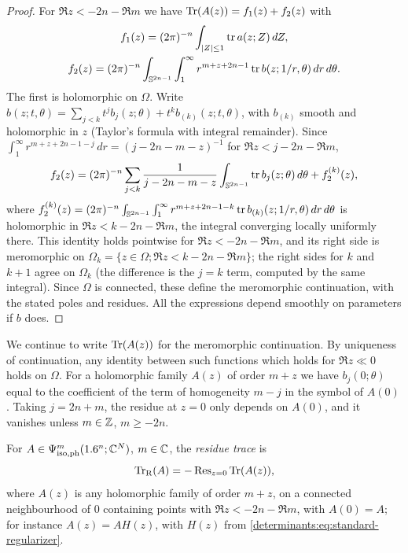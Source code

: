 \begin{proof}
  For $\Re z<-2n-\Re m$ we have $\operatorname{Tr}(A(z))=f_1(z)+f_2(z)$ with
  \begin{gather*}
    f_1(z)=(2\pi)^{-n}\int_{\lvert Z\rvert\le1}\operatorname{tr} a(z;Z)\,dZ,\\
    f_2(z)=(2\pi)^{-n}\int_{\mathbb{S}^{2n-1}}\int_1^\infty r^{m+z+2n-1}\operatorname{tr} b(z;1/r,\theta)\,dr\,d\theta .
  \end{gather*}
  The first is holomorphic on $\Omega$. Write
  $b(z;t,\theta)=\sum_{j<k}t^jb_j(z;\theta)+t^kb_{(k)}(z;t,\theta)$, with
  $b_{(k)}$ smooth and holomorphic in $z$ (Taylor's formula with integral
  remainder). Since $\int_1^\infty r^{m+z+2n-1-j}\,dr=(j-2n-m-z)^{-1}$ for
  $\Re z<j-2n-\Re m$,
  \begin{equation*}
    f_2(z)=(2\pi)^{-n}\sum_{j<k}\frac{1}{j-2n-m-z}\int_{\mathbb{S}^{2n-1}}\operatorname{tr} b_j(z;\theta)\,d\theta+f_2^{(k)}(z),
  \end{equation*}
  where $f_2^{(k)}(z)=(2\pi)^{-n}\int_{\mathbb{S}^{2n-1}}\int_1^\infty r^{m+z+2n-1-k}\operatorname{tr} b_{(k)}(z;1/r,\theta)\,dr\,d\theta$
  is holomorphic in $\Re z<k-2n-\Re m$, the integral converging locally
  uniformly there. This identity holds pointwise for $\Re z<-2n-\Re m$, and its
  right side is meromorphic on $\Omega_k=\{z\in\Omega;\Re z<k-2n-\Re m\}$; the
  right sides for $k$ and $k+1$ agree on $\Omega_k$ (the difference is the
  $j=k$ term, computed by the same integral). Since $\Omega$ is connected, these
  define the meromorphic continuation, with the stated poles and residues. All
  the expressions depend smoothly on parameters if $b$ does.
\end{proof}

We continue to write $\operatorname{Tr}(A(z))$ for the meromorphic continuation. By
uniqueness of continuation, any identity between such functions which holds
for $\Re z\ll0$ holds on $\Omega$. For a holomorphic family $A(z)$ of order
$m+z$ we have $b_j(0;\theta)$ equal to the coefficient of the term of
homogeneity $m-j$ in the symbol of $A(0)$. Taking $j=2n+m$, the residue at
$z=0$ only depends on $A(0)$, and it vanishes unless $m\in\mathbb{Z}$, $m\ge-2n$.

\begin{definition}\label{determinants:def:residue-trace}
  For $A\in\Psi^{m}_{\mathrm{iso,ph}}(1.6^n;\mathbb{C}^N)$, $m\in\mathbb{C}$, the \emph{residue trace} is
  \begin{equation*}
    \operatorname{Tr}_{\mathrm{R}}(A)=-\operatorname{Res}_{z=0}\operatorname{Tr}(A(z)),
  \end{equation*}
  where $A(z)$ is any holomorphic family of order $m+z$, on a connected
  neighbourhood of $0$ containing points with $\Re z<-2n-\Re m$, with
  $A(0)=A$; for instance $A(z)=AH(z)$, with $H(z)$ from
  \eqref{determinants:eq:standard-regularizer}.
\end{definition}

